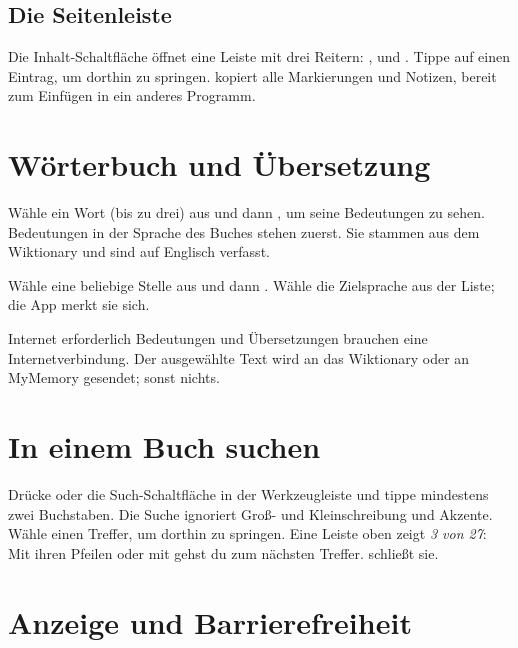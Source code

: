 \documentclass[11pt]{article}
\begin{document}
\subsection{Die Seitenleiste}
Die Inhalt-Schaltfläche öffnet eine Leiste mit drei Reitern: ,  und
. Tippe auf einen Eintrag, um dorthin zu springen. 
kopiert alle Markierungen und Notizen, bereit zum Einfügen in ein anderes Programm.

\section{Wörterbuch und Übersetzung}\label{sec:lookup}

Wähle ein Wort (bis zu drei) aus und dann , um seine Bedeutungen zu sehen.
Bedeutungen in der Sprache des Buches stehen zuerst. Sie stammen aus dem Wiktionary und sind auf
Englisch verfasst.

Wähle eine beliebige Stelle aus und dann . Wähle die Zielsprache aus der Liste; die
App merkt sie sich.

\begin{note}{Internet erforderlich}
Bedeutungen und Übersetzungen brauchen eine Internetverbindung. Der ausgewählte Text wird an das
Wiktionary oder an MyMemory gesendet; sonst nichts.
\end{note}

\section{In einem Buch suchen}\label{sec:search}

Drücke  oder die Such-Schaltfläche in der Werkzeugleiste und tippe mindestens zwei
Buchstaben. Die Suche ignoriert Groß- und Kleinschreibung und Akzente. Wähle einen Treffer, um
dorthin zu springen. Eine Leiste oben zeigt \emph{3 von 27}: Mit ihren Pfeilen oder mit 
gehst du zum nächsten Treffer.  schließt sie.

\section{Anzeige und Barrierefreiheit}\label{sec:display}
\end{document}
